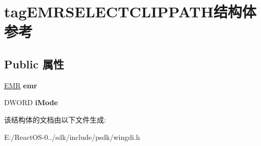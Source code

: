\hypertarget{structtag_e_m_r_s_e_l_e_c_t_c_l_i_p_p_a_t_h}{}\section{tag\+E\+M\+R\+S\+E\+L\+E\+C\+T\+C\+L\+I\+P\+P\+A\+T\+H结构体 参考}
\label{structtag_e_m_r_s_e_l_e_c_t_c_l_i_p_p_a_t_h}
\subsection*{Public 属性}
\begin{DoxyCompactItemize}
\item 
\mbox{\label{structtag_e_m_r_s_e_l_e_c_t_c_l_i_p_p_a_t_h_a8411f735bbe303a87ed8d0a71e6352f8}} 
\hyperlink{structtag_e_m_r}{E\+MR} {\bfseries emr}
\item 
\mbox{\label{structtag_e_m_r_s_e_l_e_c_t_c_l_i_p_p_a_t_h_a7f4ae2e28edbb87b5947f293d09ceb83}} 
D\+W\+O\+RD {\bfseries i\+Mode}
\end{DoxyCompactItemize}


该结构体的文档由以下文件生成\+:\begin{DoxyCompactItemize}
\item 
E\+:/\+React\+O\+S-\/0../sdk/include/psdk/wingdi.\+h\end{DoxyCompactItemize}
